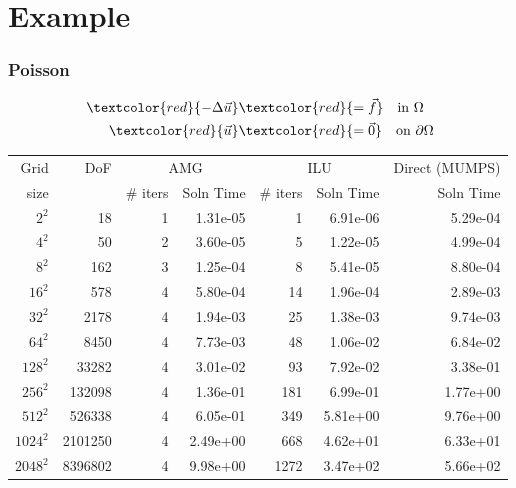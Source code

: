 \documentclass{beamer}
\newcommand{\re}[1]{{\textcolor{red}       {#1}}}
\begin{document}
\section{Example}
\begin{frame}
\vspace{-.3in}
\frametitle{Poisson}
\begin{equation} \nonumber
    \begin{aligned}
      \re{  -\Delta \vec u }& \re{= \vec f} \ \ \ \mbox{in } \Omega \\
         \re{\vec u} &\re{= \vec 0} \ \ \ \mbox{on } \partial\Omega
    \end{aligned}
\end{equation}


{\footnotesize
\begin{tabular}{rrrrrrr}
\hline
 Grid  &      DoF & \multicolumn{2}{c}{AMG} & \multicolumn{2}{c}{ILU}& Direct (MUMPS)  \\

  size &       &  $\#$ iters &  Soln Time &  $\#$ iters &  Soln Time &     Soln Time \\

\hline

       $   2  ^2$&       18 &        1 &   1.31e-05 &                 1 &   6.91e-06 &   5.29e-04 \\
       $   4  ^2$&       50 &        2 &   3.60e-05 &                 5 &   1.22e-05 &   4.99e-04 \\
       $   8  ^2$&      162 &        3 &   1.25e-04 &                8 &   5.41e-05 &   8.80e-04 \\
       $  16  ^2$&      578 &        4 &   5.80e-04 &              14 &   1.96e-04 &   2.89e-03 \\
       $  32  ^2$&     2178 &        4 &   1.94e-03 &             25 &   1.38e-03 &   9.74e-03 \\
       $  64  ^2$&     8450 &        4 &   7.73e-03 &             48 &   1.06e-02 &   6.84e-02 \\
       $ 128 ^2$ &    33282 &        4 &   3.01e-02 &           93 &   7.92e-02 &   3.38e-01 \\
       $ 256 ^2$ &   132098 &        4 &   1.36e-01 &         181 &   6.99e-01 &   1.77e+00 \\
       $ 512 ^2$ &   526338 &        4 &   6.05e-01 &         349 &   5.81e+00 &   9.76e+00 \\
       $1024^2$ &  2101250 &        4 &   2.49e+00 &       668 &   4.62e+01 &   6.33e+01 \\
      $2048^2$ &  8396802 &        4 &       9.98e+00 &          1272 &     3.47e+02 &         5.66e+02 \\
\hline
\end{tabular}

}


\end{frame}
\end{document}
